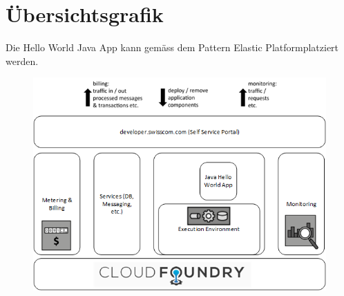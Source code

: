 \section{Übersichtsgrafik}
Die Hello World Java App kann gemäss dem Pattern \glqq Elastic Platform\grqq platziert werden.
\begin{figure}[H]
\centering
\includegraphics[scale=0.7]{images/visualisierung}
\end{figure}


